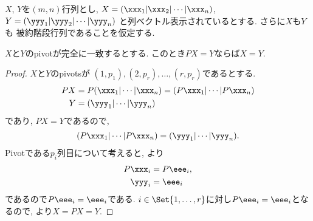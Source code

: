 $X$, $Y$を$(m,n)$行列とし,
$X=(\xxx_1|\xxx_2|\cdots|\xxx_n)$,
$Y=(\yyy_1|\yyy_2|\cdots|\yyy_n)$
と列ベクトル表示されているとする.
さらに$X$も$Y$も
被約階段行列であることを仮定する.

\begin{lemma}
  \label{lem:7}
  $X$と$Y$のpivotが完全に一致するとする.
  このとき$PX=Y$ならば$X=Y$.
\end{lemma}
\begin{proof}
  $X$と$Y$のpivotsが
  $(1,p_1),(2,p_r),\ldots,(r,p_r)$であるとする.
  \begin{align*}
    PX&=P(\xxx_1|\cdots|\xxx_n)=(P\xxx_1|\cdots|P\xxx_n)\\
    Y&=(\yyy_1|\cdots|\yyy_n)
  \end{align*}
  であり, $PX=Y$であるので,
  \begin{align*}
    (P\xxx_1|\cdots|P\xxx_n)=(\yyy_1|\cdots|\yyy_n).
  \end{align*}
  Pivotである$p_i$列目について考えると,
  より
  \begin{align*}
    P\xxx_i&=P\eee_i,\\
    \yyy_i&=\eee_i
  \end{align*}
  であるので$P\eee_i=\eee_i$である.
  $i\in\Set{1,\ldots,r}$に対し$P\eee_i=\eee_i$となるので,
  より$X=PX=Y$.  
\end{proof}

